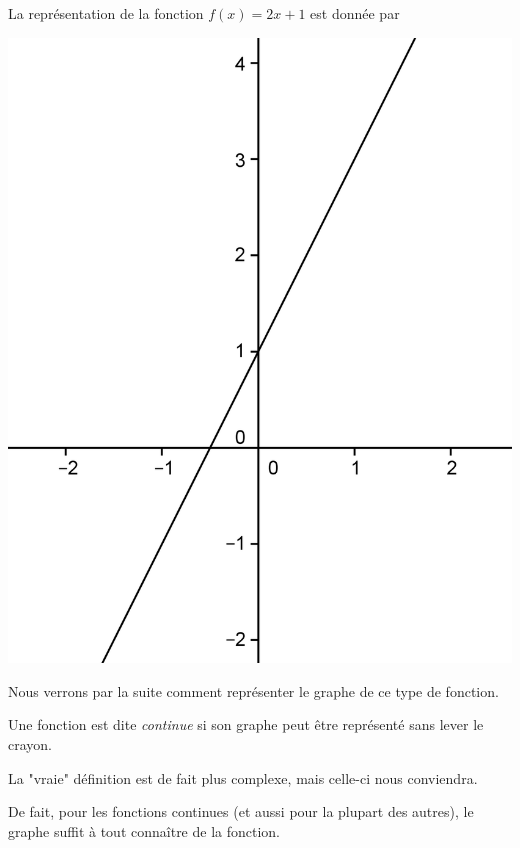\begin{exemple}
La représentation de la fonction $f(x) = 2x+1$ est donnée par
\begin{center}
\includegraphics{affines/fct_intro_graphe.png}
\end{center}
Nous verrons par la suite comment représenter le graphe de ce type de fonction.
\end{exemple}

\begin{definition}
Une fonction est dite \emph{continue} si son graphe peut être représenté sans lever le crayon.
\end{definition}

La "vraie" définition est de fait plus complexe, mais celle-ci nous conviendra.

De fait, pour les fonctions continues (et aussi pour la plupart des autres), le graphe suffit à tout connaître de la fonction.

